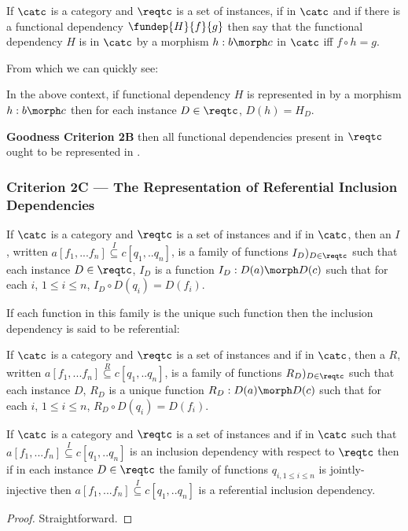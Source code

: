 \begin{definition}
If $\catc$ is a category and $\reqtc$ is a set of instances, 
if \fgsourcediag in $\catc$ 
and if there is a functional dependency $\fundep{H}{f}{g}$ then say that 
the functional dependency $H$ is  in $\catc$  
by a morphism  $h:b \morph c$ in $\catc$ 
iff $f \circ h =g$.
\end{definition}
From which we can quickly see:
\begin{observation}
In the above context, if functional dependency $H$ is represented in \catcw by a morphism $h:b \morph c$ then for each instance $D \in \reqtc$, $D(h)=H_D$.
\end{observation}

\textbf {Goodness Criterion 2B} \IfSforCwithRCwords then all functional dependencies present in $\reqtc$
ought to be represented in \catc.

\subsubsection{Criterion 2C --- The Representation of Referential Inclusion Dependencies}

\begin{definition}
If $\catc$ is a category and $\reqtc$ is a set of instances 
and if
\fnsourceqnsource
in $\catc$, then an  $I$, written $a[f_1,...f_n] \overset{I}{\subseteq} c[q_1,..q_n]$, is a family of functions $I_D)_{D \in \reqtc}$
such that each instance $D \in \reqtc$, $I_D$ is a function $I_D : D(a) \morph D(c)$ such that
for each $i$, $1 \leq i \le n$, $I_D \circ D(q_i) = D(f_i)$.
\end{definition}

If each function in this family is the unique such function then the inclusion dependency is said to be referential:

\begin{definition}
If $\catc$ is a category and $\reqtc$ is a set of instances 
and if
\fnsourceqnsource
in $\catc$, then a  $R$, written $a[f_1,...f_n] \overset{R}{\subseteq} c[q_1,..q_n]$, is a family of functions $R_D)_{D \in \reqtc}$
such that each instance $D$, $R_D$ is a unique function $R_D : D(a) \morph D(c)$ such that
for each $i$, $1 \leq i \le n$, $R_D \circ D(q_i) = D(f_i)$.
\end{definition}

\begin{lemma}
If $\catc$ is a category and $\reqtc$ is a set of instances and if
\fnsourceqnsource
in $\catc$
such that $a[f_1,...f_n] \overset{I}{\subseteq} c[q_1,..q_n]$ is an inclusion dependency with respect  to $\reqtc$ then if in each instance $D \in \reqtc$ the family of functions
$q_{i, 1 \leq i \leq n}$ is jointly-injective then $a[f_1,...f_n] \overset{I}{\subseteq} c[q_1,..q_n]$ is a referential inclusion dependency.
\end{lemma}
\begin{proof}
Straightforward.
\end{proof}

